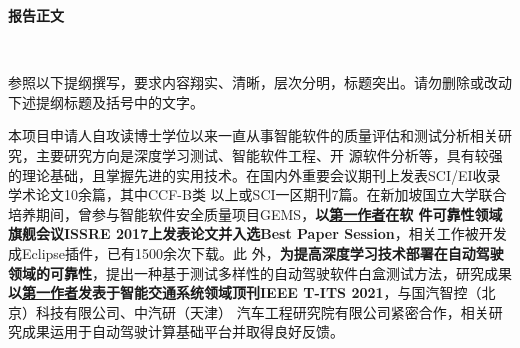 \documentclass[a4paper,zihao=-4]{article}
\begin{document}

\setlength{\abovedisplayskip}{0pt}
\setlength{\belowdisplayskip}{0pt}

\begin{center}
  {\kaishu {} \textbf{报告正文} \vspace{-3ex}}
\end{center}

\thispagestyle{empty} 　　　%

{\kaishu {}参照以下提纲撰写，要求内容翔实、清晰，层次分明，标题突出。}\alert{请勿删除或改动下述提纲标题及括号中的文字。\vspace{9bp}}





















本项目申请人自攻读博士学位以来一直从事智能软件的质量评估和测试分析相关研究，主要研究方向是深度学习测试、智能软件工程、开
源软件分析等，具有较强的理论基础，且掌握先进的实用技术。{在国内外重要会议期刊上发表SCI/EI收录学术论文10余篇，其中CCF-B类
以上或SCI一区期刊7篇}。在新加坡国立大学联合培养期间，曾参与智能软件安全质量项目GEMS，\textbf{以{\underline{第一作者}在软
件可靠性领域旗舰会议ISSRE 2017上发表论文并入选{Best Paper Session}}}，相关工作被开发成Eclipse插件，已有1500余次下载。此
外，\textbf{为提高深度学习技术部署在自动驾驶领域的可靠性}，提出{一种基于测试多样性的自动驾驶软件白盒测试方法}，研究成果
\textbf{以\underline{第一作者}发表于智能交通系统领域顶刊IEEE T-ITS 2021}，与国汽智控（北京）科技有限公司、中汽研（天津）
汽车工程研究院有限公司紧密合作，相关研究成果运用于自动驾驶计算基础平台并取得良好反馈。
\end{document}
